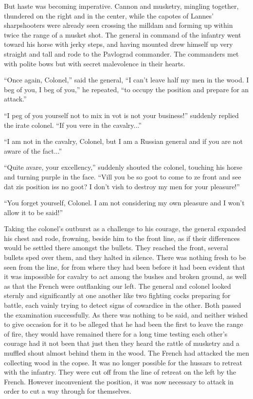 But haste was becoming imperative. Cannon and musketry, mingling
together, thundered on the right and in the center, while the
capotes of Lannes' sharpshooters were already seen crossing the
milldam and forming up within twice the range of a musket
shot. The general in command of the infantry went toward his
horse with jerky steps, and having mounted drew himself up very
straight and tall and rode to the Pavlograd commander. The
commanders met with polite bows but with secret malevolence in
their hearts.

``Once again, Colonel,'' said the general, ``I can't leave half
my men in the wood. I beg of you, I beg of you,'' he repeated,
``to occupy the position and prepare for an attack.''

``I peg of you yourself not to mix in vot is not your business!''
suddenly replied the irate colonel. ``If you vere in the
cavalry...''

``I am not in the cavalry, Colonel, but I am a Russian general
and if you are not aware of the fact...''

``Quite avare, your excellency,'' suddenly shouted the colonel,
touching his horse and turning purple in the face. ``Vill you be
so goot to come to ze front and see dat zis position iss no goot?
I don't vish to destroy my men for your pleasure!''

``You forget yourself, Colonel. I am not considering my own
pleasure and I won't allow it to be said!''

Taking the colonel's outburst as a challenge to his courage, the
general expanded his chest and rode, frowning, beside him to the
front line, as if their differences would be settled there
amongst the bullets. They reached the front, several bullets sped
over them, and they halted in silence. There was nothing fresh to
be seen from the line, for from where they had been before it had
been evident that it was impossible for cavalry to act among the
bushes and broken ground, as well as that the French were
outflanking our left. The general and colonel looked sternly and
significantly at one another like two fighting cocks preparing
for battle, each vainly trying to detect signs of cowardice in
the other. Both passed the examination successfully. As there was
nothing to be said, and neither wished to give occasion for it to
be alleged that he had been the first to leave the range of fire,
they would have remained there for a long time testing each
other's courage had it not been that just then they heard the
rattle of musketry and a muffled shout almost behind them in the
wood. The French had attacked the men collecting wood in the
copse. It was no longer possible for the hussars to retreat with
the infantry. They were cut off from the line of retreat on the
left by the French. However inconvenient the position, it was now
necessary to attack in order to cut a way through for themselves.

